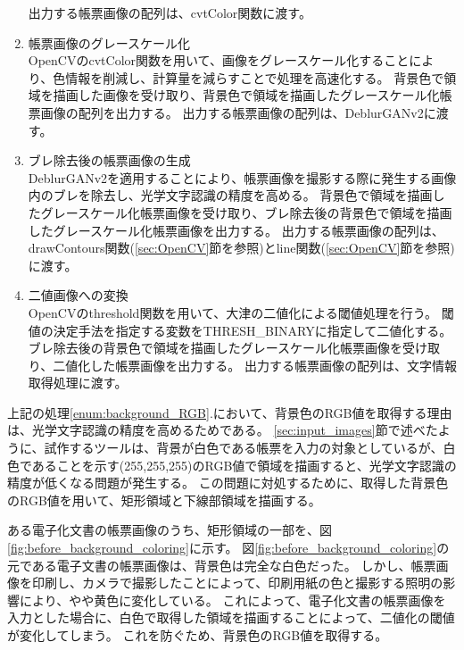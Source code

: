 \begin{enumerate}
        出力する帳票画像の配列は、cvtColor関数に渡す。
    \item 帳票画像のグレースケール化\\
        OpenCVのcvtColor関数を用いて、画像をグレースケール化することにより、色情報を削減し、計算量を減らすことで処理を高速化する。
        背景色で領域を描画した画像を受け取り、背景色で領域を描画したグレースケール化帳票画像の配列を出力する。
        出力する帳票画像の配列は、DeblurGANv2に渡す。   
    \item ブレ除去後の帳票画像の生成\\
        DeblurGANv2を適用することにより、帳票画像を撮影する際に発生する画像内のブレを除去し、光学文字認識の精度を高める。
        背景色で領域を描画したグレースケール化帳票画像を受け取り、ブレ除去後の背景色で領域を描画したグレースケール化帳票画像を出力する。
        出力する帳票画像の配列は、drawContours関数(\ref{sec:OpenCV}節を参照)とline関数(\ref{sec:OpenCV}節を参照)に渡す。
    \item 二値画像への変換\\
        OpenCVのthreshold関数を用いて、大津の二値化による閾値処理を行う。
        閾値の決定手法を指定する変数をTHRESH\_BINARYに指定して二値化する。
        ブレ除去後の背景色で領域を描画したグレースケール化帳票画像を受け取り、二値化した帳票画像を出力する。
        出力する帳票画像の配列は、文字情報取得処理に渡す。
\end{enumerate}

上記の処理\ref{enum:background_RGB}.において、背景色のRGB値を取得する理由は、光学文字認識の精度を高めるためである。
\ref{sec:input_images}節で述べたように、試作するツールは、背景が白色である帳票を入力の対象としているが、白色であることを示す(255,255,255)のRGB値で領域を描画すると、光学文字認識の精度が低くなる問題が発生する。
この問題に対処するために、取得した背景色のRGB値を用いて、矩形領域と下線部領域を描画する。

ある電子化文書の帳票画像のうち、矩形領域の一部を、図\ref{fig:before_background_coloring}に示す。
図\ref{fig:before_background_coloring}の元である電子文書の帳票画像は、背景色は完全な白色だった。
しかし、帳票画像を印刷し、カメラで撮影したことによって、印刷用紙の色と撮影する照明の影響により、やや黄色に変化している。
これによって、電子化文書の帳票画像を入力とした場合に、白色で取得した領域を描画することによって、二値化の閾値が変化してしまう。
これを防ぐため、背景色のRGB値を取得する。

